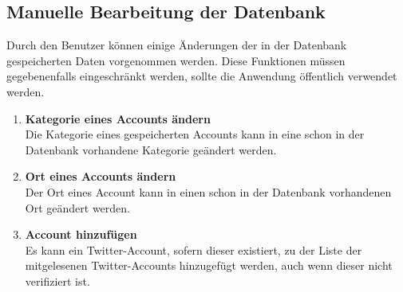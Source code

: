 \subsection{Manuelle Bearbeitung der Datenbank}
Durch den Benutzer können einige Änderungen der in der Datenbank  gespeicherten Daten vorgenommen werden. Diese Funktionen müssen gegebenenfalls eingeschränkt werden, sollte die Anwendung öffentlich verwendet werden.
\begin{enumerate}[ align=left, label={\textbf{\textbackslash F40\arabic*0\textbackslash}}]
	\item \textbf{Kategorie eines Accounts ändern}  \label{PF:KategorieAendern} \\
	Die Kategorie eines gespeicherten Accounts kann in eine schon in der Datenbank vorhandene Kategorie geändert werden.
	\item \textbf{Ort eines Accounts ändern} \label{PF:OrtAendern}\\
	Der Ort eines Account kann in einen schon in der Datenbank vorhandenen Ort geändert werden.
	\item \textbf{Account hinzufügen} \label{PF:AccountHinzu} \\
	Es kann ein Twitter-Account, sofern dieser existiert, zu der Liste der mitgelesenen Twitter-Accounts hinzugefügt werden, auch wenn dieser nicht verifiziert ist.
\end{enumerate}

